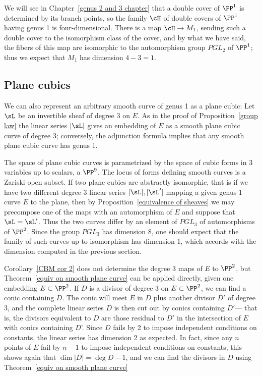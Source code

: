 We will see in Chapter~\ref{genus 2 and 3 chapter} that a double cover of $\PP^1$ is determined by  its branch points, so the family $\cH$ of double covers of $\PP^1$ having genus 1 is four-dimensional. There is a map $\cH \to M_1$, sending such a double cover to the isomorphism class of the cover, and by what we have said, the fibers of this map are isomorphic to the automorphism group $PGL_2$ of $\PP^1$; thus we expect that $M_1$ has dimension $4-3=1$.

\subsection{Plane cubics}

We can also represent an arbitrary smooth curve of genus 1 as a plane cubic:
Let $\sL$ be an invertible sheaf of degree 3 on $E$. As in the proof of Proposition~\ref{group law} the linear series $|\sL|$ gives an embedding of $E$ as a smooth plane cubic curve of degree 3; conversely, the adjunction formula implies that any smooth plane cubic curve has genus 1. 

The space of plane cubic curves is parametrized by the space of cubic forms in 3 variables up to 
scalars, a  $\PP^9$. The locus of forms defining smooth curves is a Zariski open subset. If two plane cubics are abstractly
isomorphic, that is if we have two different degree 3 linear series $|\sL|, |\sL'|$ mapping a given genus 1 curve $E$ to the plane, then by
Proposition~\ref{equivalence of sheaves} we may  precompose one of the maps with an automorphism of $E$
and suppose that $\sL = \sL'$. Thus the two curves differ by an element of $PGL_3$ of automorphisms of $\PP^2$. Since the group $PGL_3$ has dimension 8, one should expect that the family of such curves up to isomorphism has dimension 1, which accords with the dimension computed in the previous section.

Corollary~\ref{CBM cor 2} does not determine the degree 3 maps of $E$ to $\PP^{2}$, but Theorem~\ref{equiv on smooth plane curve} can be applied directly, given one embedding $E\subset \PP^2$. If $D$ is a divisor of degree 3 on $E\subset \PP^2$, we can
find a conic containing $D$. The conic will meet $E$ in $D$ plus another divisor $D'$ of degree 3, and the complete linear series
$D$ is then cut out by conics containing $D'$--- that is, the divisors equivalent to $D$ are those residual to $D'$ in the intersection
of $E$ with conics containing $D$'. Since $D$ fails by 2 to impose independent conditions on constants, the linear series has dimension 2 as expected. In fact, since any $n$ points of $E$ fail by $n-1$ to impose independent conditions on constants, this shows again
that $\dim |D| = \deg D -1$, and we can find the divisors in $D$ using Theorem~\ref{equiv on smooth plane curve}

